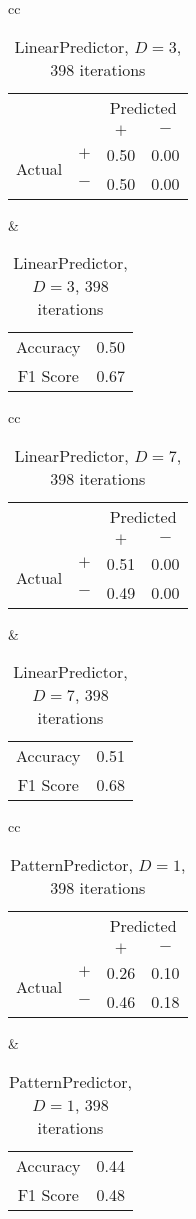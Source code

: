 \documentclass[twocolumn,10pt]{asme2ej}
\begin{document}
\begin{table}
  \begin{tabular}{cc}
    \begin{tabular}{cc|cc}
      & & \multicolumn{2}{c}{Predicted} \\
      & & $+ $ & $-$ \\
      \hline
      \multirow{2}{*}{Actual}
      & $+$ & 0.50 & 0.00 \\
      & $-$ & 0.50 & 0.00 \\
      \hline
    \end{tabular}
    &
    \begin{tabular}{cc}
      Accuracy & 0.50 \\
      F1 Score & 0.67 \\
    \end{tabular}
  \end{tabular}
  \caption{LinearPredictor, $D=3$, 398 iterations}
  \label{pred-perf-LinearPredictor-3-398}
\end{table}


\begin{table}
  \begin{tabular}{cc}
    \begin{tabular}{cc|cc}
      & & \multicolumn{2}{c}{Predicted} \\
      & & $+ $ & $-$ \\
      \hline
      \multirow{2}{*}{Actual}
      & $+$ & 0.51 & 0.00 \\
      & $-$ & 0.49 & 0.00 \\
      \hline
    \end{tabular}
    &
    \begin{tabular}{cc}
      Accuracy & 0.51 \\
      F1 Score & 0.68 \\
    \end{tabular}
  \end{tabular}
  \caption{LinearPredictor, $D=7$, 398 iterations}
  \label{pred-perf-LinearPredictor-7-398}
\end{table}


\begin{table}
  \begin{tabular}{cc}
    \begin{tabular}{cc|cc}
      & & \multicolumn{2}{c}{Predicted} \\
      & & $+ $ & $-$ \\
      \hline
      \multirow{2}{*}{Actual}
      & $+$ & 0.26 & 0.10 \\
      & $-$ & 0.46 & 0.18 \\
      \hline
    \end{tabular}
    &
    \begin{tabular}{cc}
      Accuracy & 0.44 \\
      F1 Score & 0.48 \\
    \end{tabular}
  \end{tabular}
  \caption{PatternPredictor, $D=1$, 398 iterations}
  \label{pred-perf-PatternPredictor-1-398}
\end{table}
\end{document}
